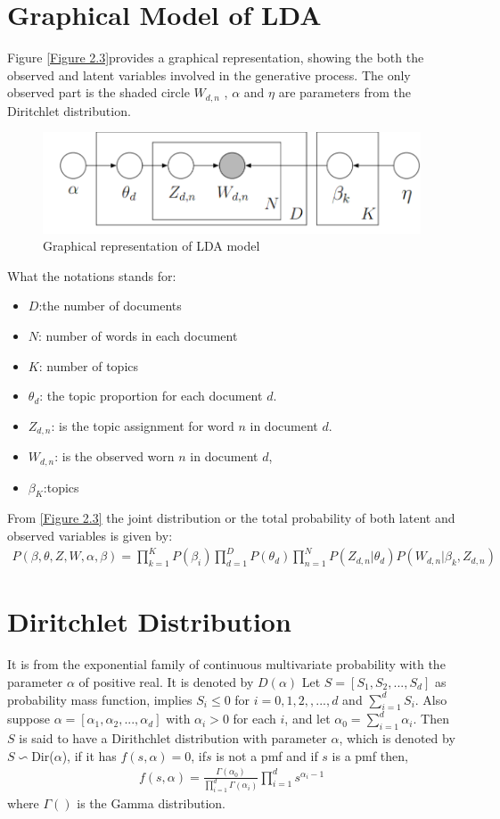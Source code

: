 \section{Graphical Model of LDA}
Figure \eqref{Figure 2.3}provides a graphical representation, showing the both the observed and latent variables involved in the generative process. The only observed part is the shaded circle $W_{d,n}$ , $\alpha$ and $\eta$ are parameters from the Diritchlet distribution.
\begin{figure}[hbtp]
\centering
\includegraphics[scale=0.5]{Graphical.png}
\caption{Graphical representation of LDA model} \label{Figure 2.3}
\end{figure}
What the notations stands for:
\begin{itemize}
\item$D$:the number of documents
\item$N$: number of words in each document
\item$K$: number of topics
\item$\theta_d$: the topic proportion for each document $d$.
\item $Z_{d,n}$: is the topic assignment for word $n$ in document $d$.
\item $W_{d,n}$: is the observed worn $n$ in document $d$,
\item $\beta_K$:topics
\end{itemize}
From \eqref{Figure 2.3} the joint  distribution or the total probability of both latent and observed variables is given by:
\begin{align}
P(\beta,\theta,Z,W, \alpha, \beta )=\prod_{k=1}^{K}P(\beta_i)\prod_{d=1}^{D}P(\theta_d)
\prod_{n=1}^{N}P(Z_{d,n}|\theta_d)P(W_{d,n}|\beta_k,Z_{d,n})
\end{align}
\section{Diritchlet Distribution}
It is from the exponential family of continuous multivariate probability with the parameter $\alpha$ of positive real. It is denoted by $D(\alpha)$
Let $S=[S_1,S_2,...,S_d] $ as probability mass function, implies $S_i\leqslant 0$ for $i=0,1,2,,...,d$ and $\sum _{i=1}^{d}S_i$. Also suppose $\alpha=[\alpha_1,\alpha_2,...,\alpha_d]$ with $\alpha_i>0$ for each $i$, and let $\alpha_0=\sum _{i=1}^{d}\alpha_i$. Then $S$ is said to have a Dirithchlet distribution
with parameter $\alpha$, which is denoted by $S \backsim $Dir($\alpha$), if it has $f(s,\alpha)=0$, if$s$ is not a pmf and if $s$ is a pmf then,
\begin{align}
f(s,\alpha)=\frac{\Gamma(\alpha_0)}{\prod_{i=1}^{d}\Gamma(\alpha_i)}\prod_{i=1}^{d}s^{\alpha_i -1}
\end{align}
where $\Gamma()$ is the Gamma distribution.

